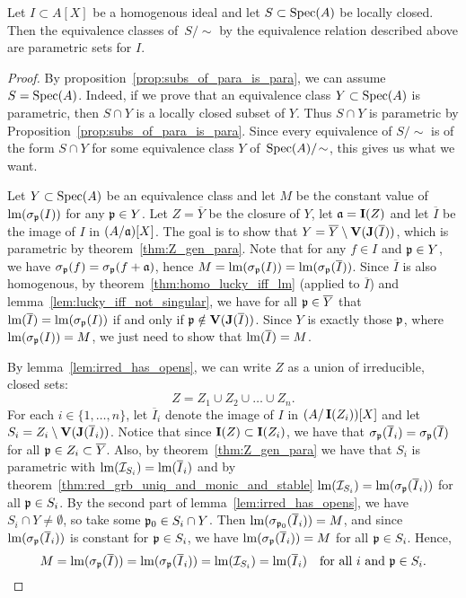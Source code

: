 \begin{theorem}\label{thm:proj_equiv_are_para}
  Let $I \subset A[X]$ be a homogenous ideal and let $S \subset \operatorname{Spec}(A)$ be locally closed. Then the equivalence classes of $\,S/\sim$ by the equivalence relation described above are parametric sets for $I$.
\end{theorem}
\begin{proof}
  By proposition~\ref{prop:subs_of_para_is_para}, we can assume $S = \operatorname{Spec}(A)$. Indeed, if we prove that an equivalence class $Y \subset \operatorname{Spec}(A)$ is parametric, then $S \cap Y$ is a locally closed subset of $Y$. Thus $S \cap Y$ is parametric by Proposition~\ref{prop:subs_of_para_is_para}. Since every equivalence of $S/\!\sim$ is of the form $S \cap Y$ for some equivalence class $Y$ of $\,\operatorname{Spec}(A)/\!\sim$, this gives us what we want.

  Let $Y \subset \operatorname{Spec}(A)$ be an equivalence class and let $M$ be the constant value of $\operatorname{lm}(\sigma_{\mathfrak p}(I))$ for any $\mathfrak p \in Y$. Let $Z = \overline Y$ be the closure of $Y$, let $\mathfrak{a} = \operatorname{\mathbf I}(Z)$ and let $\overline I$ be the image of $I$ in $(A/\mathfrak{a})[X]$. The goal is to show that $Y = \overline Y \setminus \operatorname{\mathbf V}(\operatorname{\mathbf J}(\overline I))$, which is parametric by theorem~\ref{thm:Z_gen_para}. Note that for any $f \in I$ and $\mathfrak p \in Y$, we have $\sigma_{\mathfrak p}(f) = \sigma_{\mathfrak p}(f + \mathfrak{a})$, hence $M = \operatorname{lm}(\sigma_{\mathfrak p}(I)) = \operatorname{lm}(\sigma_{\mathfrak p}(\overline I))$. Since $\overline I$ is also homogenous, by theorem~\ref{thm:homo_lucky_iff_lm} (applied to $\overline I$) and lemma~\ref{lem:lucky_iff_not_singular}, we have for all $\mathfrak p \in \overline Y$ that $\operatorname{lm}(\overline I) = \operatorname{lm}(\sigma_{\mathfrak p}(I))$ if and only if $\mathfrak p \notin \operatorname{\mathbf V}(\operatorname{\mathbf J}(\overline I))$. Since $Y$ is exactly those $\mathfrak p$, where $\operatorname{lm}(\sigma_{\mathfrak p}(I)) = M$, we just need to show that $\operatorname{lm}(\overline I) = M$.

  By lemma~\ref{lem:irred_has_opens}, we can write $Z$ as a union of irreducible, closed sets: \[Z = Z_{1} \cup Z_{2} \cup \dots \cup Z_{n}.\]
  For each $i \in \{1, \dots, n\}$, let $\overline I_{i}$ denote the image of $I$ in $(A/\operatorname{\mathbf I}(Z_{i}))[X]$ and let $S_{i} = Z_{i} \setminus \operatorname{\mathbf V}(\operatorname{\mathbf J}(\overline I_{i}))$. Notice that since $\operatorname{\mathbf I}(Z) \subset \operatorname{\mathbf I}(Z_{i})$, we have that $\sigma_{\mathfrak p}(\overline I_{i}) = \sigma_{\mathfrak p}(\overline I)$ for all $\mathfrak p \in Z_{i} \subset \overline Y$. Also, by theorem~\ref{thm:Z_gen_para} we have that $S_{i}$ is parametric with $\operatorname{lm}(\mathcal I_{S_{i}}) = \operatorname{lm}(\overline I_{i})$ and by theorem~\ref{thm:red_grb_uniq_and_monic_and_stable} $\operatorname{lm}(\mathcal I_{S_{i}}) = \operatorname{lm}(\sigma_{\mathfrak p}(\overline I_{i}))$ for all $\mathfrak p \in S_{i}$. By the second part of lemma~\ref{lem:irred_has_opens}, we have $S_{i} \cap Y \neq \emptyset$, so take some $\mathfrak p_{0} \in S_{i} \cap Y$. Then $\operatorname{lm}(\sigma_{\mathfrak p_{0}}(\overline I_{i})) = M$, and since $\operatorname{lm}(\sigma_{\mathfrak p}(\overline I_{i}))$ is constant for $\mathfrak p \in S_{i}$, we have $\operatorname{lm}(\sigma_{\mathfrak p}(\overline I_{i})) = M$ for all $\mathfrak p \in S_{i}$. Hence,
  \[M = \operatorname{lm}(\sigma_{\mathfrak p}(\overline I)) = \operatorname{lm}(\sigma_{\mathfrak p}(\overline I_{i})) = \operatorname{lm}(\mathcal I_{S_{i}}) = \operatorname{lm}(\overline I_{i}) \quad \text{for all $i$ and $\mathfrak p \in S_{i}$}.\]


\end{proof}
